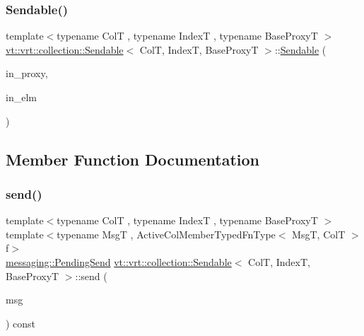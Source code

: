 \subsubsection{\texorpdfstring{Sendable()}{Sendable()}\hspace{0.1cm}{\footnotesize\ttfamily [2/2]}}
{\footnotesize\ttfamily template$<$typename ColT , typename IndexT , typename Base\+ProxyT $>$ \\
\hyperlink{structvt_1_1vrt_1_1collection_1_1_sendable}{vt\+::vrt\+::collection\+::\+Sendable}$<$ ColT, IndexT, Base\+ProxyT $>$\+::\hyperlink{structvt_1_1vrt_1_1collection_1_1_sendable}{Sendable} (\begin{DoxyParamCaption}\item[{typename Base\+Proxy\+T\+::\+Proxy\+Type const \&}]{in\+\_\+proxy,  }\item[{typename Base\+Proxy\+T\+::\+Element\+Proxy\+Type const \&}]{in\+\_\+elm }\end{DoxyParamCaption})}



\subsection{Member Function Documentation}
\mbox{\label{structvt_1_1vrt_1_1collection_1_1_sendable_a321d85ceafaf6525875fb7468a80ac6d}} 
\subsubsection{\texorpdfstring{send()}{send()}\hspace{0.1cm}{\footnotesize\ttfamily [1/6]}}
{\footnotesize\ttfamily template$<$typename ColT , typename IndexT , typename Base\+ProxyT $>$ \\
template$<$typename MsgT , Active\+Col\+Member\+Typed\+Fn\+Type$<$ Msg\+T, Col\+T $>$ f$>$ \\
\hyperlink{structvt_1_1messaging_1_1_pending_send}{messaging\+::\+Pending\+Send} \hyperlink{structvt_1_1vrt_1_1collection_1_1_sendable}{vt\+::vrt\+::collection\+::\+Sendable}$<$ ColT, IndexT, Base\+ProxyT $>$\+::send (\begin{DoxyParamCaption}\item[{MsgT $\ast$}]{msg }\end{DoxyParamCaption}) const}

